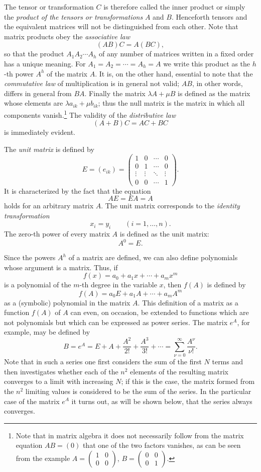 The tensor or transformation $C$ is therefore called the inner product or simply the \emph{product of the tensors or transformations} $A$ and $B$. Henceforth tensors and the equivalent matrices will not be distinguished from each other. Note that matrix products obey the \emph{associative law}
\[
(AB)C=A(BC),
\]
so that the product $A_1A_2\cdots A_h$ of any number of matrices written in a fixed order has a unique meaning. For $A_1=A_2=\cdots=A_h=A$ we write this product as the $h$-th power $A^h$ of the matrix $A$. It is, on the other hand, essential to note that the \emph{commutative law} of multiplication is in general not valid; $AB$, in other words, differs in general from $BA$. Finally the matrix $\lambda A+\mu B$ is defined as the matrix whose elements are $\lambda a_{ik}+\mu b_{ik}$; thus the null matrix is the matrix in which all components vanish.\footnote{Note that in matrix algebra it does not necessarily follow from the matrix equation $AB=(0)$ that one of the two factors vanishes, as can be seen from the example $A=\begin{pmatrix}1&0\\0&0\end{pmatrix}$, $B=\begin{pmatrix}0&0\\0&1\end{pmatrix}$.} The validity of the \emph{distributive law}
\[
(A+B)C=AC+BC
\]
is immediately evident.

The \emph{unit matrix} is defined by
\[
E=(e_{ik})=
\begin{pmatrix}
1&0&\cdots&0\\
0&1&\cdots&0\\
\vdots&\vdots&\ddots&\vdots\\
0&0&\cdots&1
\end{pmatrix}.
\]
It is characterized by the fact that the equation
\[
AE=EA=A
\]
holds for an arbitrary matrix $A$. The unit matrix corresponds to the \emph{identity transformation}
\[
x_i=y_i\qquad(i=1,\ldots,n).
\]
The zero-th power of every matrix $A$ is defined as the unit matrix:
\[
A^0=E.
\]

Since the powers $A^h$ of a matrix are defined, we can also define polynomials whose argument is a matrix. Thus, if
\[
f(x)=a_0+a_1x+\cdots+a_mx^m
\]
is a polynomial of the $m$-th degree in the variable $x$, then $f(A)$ is defined by
\[
f(A)=a_0E+a_1A+\cdots+a_mA^m
\]
as a (symbolic) polynomial in the matrix $A$. This definition of a matrix as a function $f(A)$ of $A$ can even, on occasion, be extended to functions which are not polynomials but which can be expressed as power series. The matrix $e^A$, for example, may be defined by
\[
B=e^A=E+A+\frac{A^2}{2!}+\frac{A^3}{3!}+\cdots=\sum_{\nu=0}^{\infty}\frac{A^\nu}{\nu!}.
\]
Note that in such a series one first considers the sum of the first $N$ terms and then investigates whether each of the $n^2$ elements of the resulting matrix converges to a limit with increasing $N$; if this is the case, the matrix formed from the $n^2$ limiting values is considered to be the sum of the series. In the particular case of the matrix $e^A$ it turns out, as will be shown below, that the series always converges.

